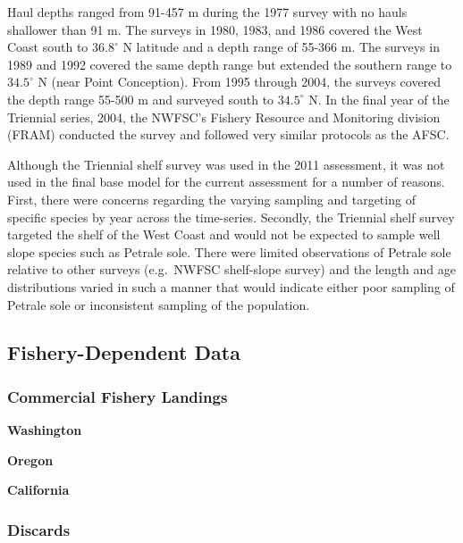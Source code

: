 \documentclass[12pt,]{article}
\begin{document}
Haul depths ranged from 91-457 m during the 1977 survey with no hauls
shallower than 91 m. The surveys in 1980, 1983, and 1986 covered the
West Coast south to \(36.8^\circ\) N latitude and a depth range of
55-366 m. The surveys in 1989 and 1992 covered the same depth range but
extended the southern range to \(34.5^\circ\) N (near Point Conception).
From 1995 through 2004, the surveys covered the depth range 55-500 m and
surveyed south to \(34.5^\circ\) N. In the final year of the Triennial
series, 2004, the NWFSC's Fishery Resource and Monitoring division
(FRAM) conducted the survey and followed very similar protocols as the
AFSC.

Although the Triennial shelf survey was used in the 2011 assessment, it
was not used in the final base model for the current assessment for a
number of reasons. First, there were concerns regarding the varying
sampling and targeting of specific species by year across the
time-series. Secondly, the Triennial shelf survey targeted the shelf of
the West Coast and would not be expected to sample well slope species
such as Petrale sole. There were limited observations of Petrale sole
relative to other surveys (e.g.~NWFSC shelf-slope survey) and the length
and age distributions varied in such a manner that would indicate either
poor sampling of Petrale sole or inconsistent sampling of the
population.

\subsection{Fishery-Dependent Data}\label{fishery-dependent-data}

\subsubsection{Commercial Fishery
Landings}\label{commercial-fishery-landings}

\textbf{Washington}

\textbf{Oregon}

\textbf{California}

\subsubsection{Discards}\label{discards}
\end{document}
